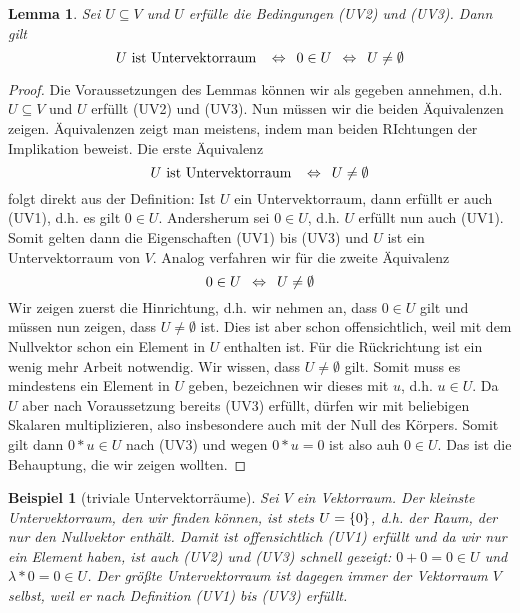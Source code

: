 \documentclass[ngerman, a4paper, 12pt]{scrartcl}
\newcounter{themcount}
\theoremstyle{plain}
\newtheorem{lemma}[themcount]{Lemma}
\newtheorem{beispiel}[themcount]{Beispiel}
\theoremstyle{proofstyle}
\newtheorem{proof}{Beweis}
\begin{document}
	\begin{lemma}
		Sei $U \subseteq V$ und $U$ erfülle die Bedingungen (UV2) und (UV3). Dann gilt 
		\begin{equation*}
			U \text{ ist Untervektorraum } \enskip \Leftrightarrow \enskip 0 \in U  \enskip \Leftrightarrow \enskip U \neq \emptyset
		\end{equation*}
	\end{lemma}
	\begin{proof}
		Die Voraussetzungen des Lemmas können wir als gegeben annehmen, d.h. $U \subseteq V$ und $U$ erfüllt (UV2) und (UV3). Nun müssen wir die beiden Äquivalenzen zeigen. Äquivalenzen zeigt man meistens, indem man beiden RIchtungen der Implikation beweist. Die erste Äquivalenz
		\begin{equation*}
			U \text{ ist Untervektorraum } \enskip \Leftrightarrow \enskip U \neq \emptyset
		\end{equation*}
		folgt direkt aus der Definition: Ist $U$ ein Untervektorraum, dann erfüllt er auch (UV1), d.h. es gilt $0 \in U$. Andersherum sei $0 \in U$, d.h. $U$ erfüllt nun auch (UV1). Somit gelten dann die Eigenschaften (UV1) bis (UV3) und $U$ ist ein Untervektorraum von $V$. Analog verfahren wir für die zweite Äquivalenz
		\begin{equation*}
			0 \in U  \enskip \Leftrightarrow \enskip U \neq \emptyset
		\end{equation*}
		Wir zeigen zuerst die Hinrichtung, d.h. wir nehmen an, dass $0 \in U$ gilt und müssen nun zeigen, dass $U \neq \emptyset$ ist. Dies ist aber schon offensichtlich, weil mit dem Nullvektor schon ein Element in $U$ enthalten ist. Für die Rückrichtung ist ein wenig mehr Arbeit notwendig. Wir wissen, dass $U \neq \emptyset$ gilt. Somit muss es mindestens ein Element in $U$ geben, bezeichnen wir dieses mit $u$, d.h. $u \in U$. Da $U$ aber nach Voraussetzung bereits (UV3) erfüllt, dürfen wir mit beliebigen Skalaren multiplizieren, also insbesondere auch mit der Null des Körpers. Somit gilt dann $0 * u \in U$ nach (UV3) und wegen $0 * u = 0$ ist also auh $0 \in U$. Das ist die Behauptung, die wir zeigen wollten.
	\end{proof}

	\begin{beispiel}[triviale Untervektorräume]
		Sei $V$ ein Vektorraum. Der kleinste Untervektorraum, den wir finden können, ist stets $U = \left\{ 0 \right\}$, d.h. der Raum, der nur den Nullvektor enthält. Damit ist offensichtlich (UV1) erfüllt und da wir nur ein Element haben, ist auch (UV2) und (UV3) schnell gezeigt: $0 + 0 = 0 \in U$ und $\lambda * 0 = 0 \in U$.
		Der größte Untervektorraum ist dagegen immer der Vektorraum $V$ selbst, weil er nach Definition (UV1) bis (UV3) erfüllt.
	\end{beispiel}
\end{document}
